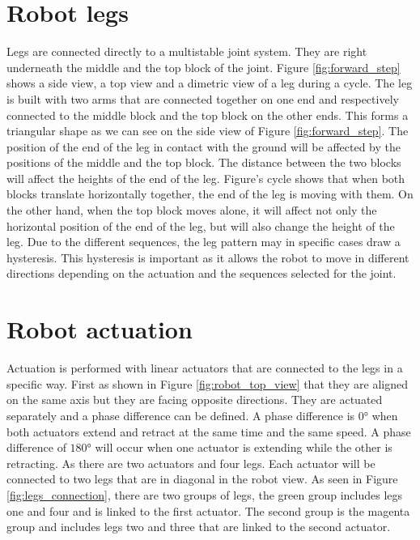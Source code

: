     \section{Robot legs}\label{sec:legs}
        Legs are connected directly to a multistable joint system. They are right underneath the middle and the top block of the joint. Figure \ref{fig:forward_step} shows a side view, a top view and a dimetric view of a leg during a cycle. 
        The leg is built with two arms that are connected together on one end and respectively connected to the middle block and the top block on the other ends. This forms a triangular shape as we can see on the side view of Figure \ref{fig:forward_step}. The position of the end of the leg in contact with the ground will be affected by the positions of the middle and the top block. The distance between the two blocks will affect the heights of the end of the leg. Figure's cycle shows that when both blocks translate horizontally together, the end of the leg is moving with them. On the other hand, when the top block moves alone, it will affect not only the horizontal position of the end of the leg, but will also change the height of the leg. Due to the different sequences, the leg pattern may in specific cases draw a hysteresis. This hysteresis is important as it allows the robot to move in different directions depending on the actuation and the sequences selected for the joint. 
        
    \section{Robot actuation}\label{sec:actuation}
        Actuation is performed with linear actuators that are connected to the legs in a specific way. First as shown in Figure \ref{fig:robot_top_view} that they are aligned on the same axis but they are facing opposite directions. They are actuated separately and a phase difference can be defined. A phase difference is $0°$ when both actuators extend and retract at the same time and the same speed. A phase difference of $180°$ will occur when one actuator is extending while the other is retracting. As there are two actuators and four legs. Each actuator will be connected to two legs that are in diagonal in the robot view. As seen in Figure \ref{fig:legs_connection}, there are two groups of legs, the green group includes legs one and four and is linked to the first actuator. The second group is the magenta group and includes legs two and three that are linked to the second actuator. 
        

